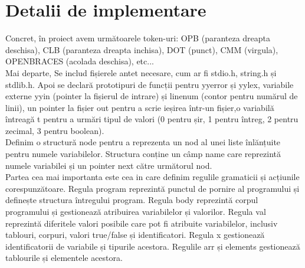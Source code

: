 \documentclass{article}
\begin{document}
\section{Detalii de implementare}
Concret, în proiect avem următoarele token-uri: OPB (paranteza dreapta deschisa), CLB (paranteza dreapta inchisa), DOT (punct), CMM (virgula), OPENBRACES (acolada deschisa), etc... \\
Mai departe, Se includ fișierele antet necesare, cum ar fi stdio.h, string.h și stdlib.h. Apoi se declară prototipuri de funcții pentru yyerror și yylex, variabile externe yyin (pointer la fișierul de intrare) și linenum (contor pentru numărul de linii), un pointer la fișier out pentru a scrie ieșirea într-un fișier,o variabilă întreagă t pentru a urmări tipul de valori (0 pentru șir, 1 pentru întreg, 2 pentru zecimal, 3 pentru boolean).\\
Definim o structură node pentru a reprezenta un nod al unei liste înlănțuite pentru numele variabilelor. Structura conține un câmp name care reprezintă numele variabilei și un pointer next către următorul nod. \\
Partea cea mai importanta este cea in care definim regulile gramaticii și acțiunile corespunzătoare.
Regula program reprezintă punctul de pornire al programului și definește structura întregului program.
Regula body reprezintă corpul programului și gestionează atribuirea variabilelor și valorilor.
Regula val reprezintă diferitele valori posibile care pot fi atribuite variabilelor, inclusiv tablouri, corpuri, valori true/false și identificatori.
Regula x gestionează identificatorii de variabile și tipurile acestora.
Regulile arr și elements gestionează tablourile și elementele acestora.
\end{document}
